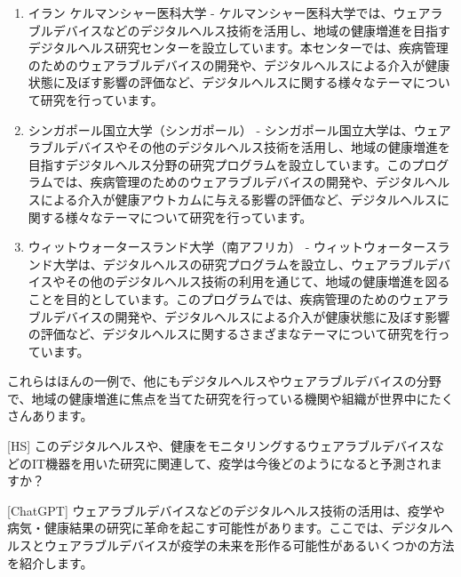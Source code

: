 \documentclass[
]{book}
\providecommand{\tightlist}{%
  \setlength{\itemsep}{0pt}\setlength{\parskip}{0pt}}
\theoremstyle{definition}
\theoremstyle{definition}
\theoremstyle{definition}
\theoremstyle{definition}
\theoremstyle{remark}
\begin{document}
\begin{enumerate}
\def\labelenumi{\arabic{enumi}.}
\tightlist
\item
  イラン ケルマンシャー医科大学 - ケルマンシャー医科大学では、ウェアラブルデバイスなどのデジタルヘルス技術を活用し、地域の健康増進を目指すデジタルヘルス研究センターを設立しています。本センターでは、疾病管理のためのウェアラブルデバイスの開発や、デジタルヘルスによる介入が健康状態に及ぼす影響の評価など、デジタルヘルスに関する様々なテーマについて研究を行っています。
\item
  シンガポール国立大学（シンガポール） - シンガポール国立大学は、ウェアラブルデバイスやその他のデジタルヘルス技術を活用し、地域の健康増進を目指すデジタルヘルス分野の研究プログラムを設立しています。このプログラムでは、疾病管理のためのウェアラブルデバイスの開発や、デジタルヘルスによる介入が健康アウトカムに与える影響の評価など、デジタルヘルスに関する様々なテーマについて研究を行っています。
\item
  ウィットウォータースランド大学（南アフリカ） - ウィットウォータースランド大学は、デジタルヘルスの研究プログラムを設立し、ウェアラブルデバイスやその他のデジタルヘルス技術の利用を通じて、地域の健康増進を図ることを目的としています。このプログラムでは、疾病管理のためのウェアラブルデバイスの開発や、デジタルヘルスによる介入が健康状態に及ぼす影響の評価など、デジタルヘルスに関するさまざまなテーマについて研究を行っています。
\end{enumerate}

これらはほんの一例で、他にもデジタルヘルスやウェアラブルデバイスの分野で、地域の健康増進に焦点を当てた研究を行っている機関や組織が世界中にたくさんあります。

{[}HS{]} このデジタルヘルスや、健康をモニタリングするウェアラブルデバイスなどのIT機器を用いた研究に関連して、疫学は今後どのようになると予測されますか？

{[}ChatGPT{]} ウェアラブルデバイスなどのデジタルヘルス技術の活用は、疫学や病気・健康結果の研究に革命を起こす可能性があります。ここでは、デジタルヘルスとウェアラブルデバイスが疫学の未来を形作る可能性があるいくつかの方法を紹介します。
\end{document}

